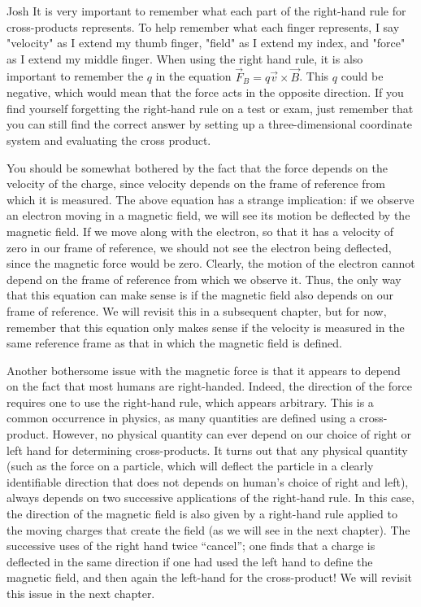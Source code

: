 \begin{studentOpinion}{Josh}{}
It is very important to remember what each part of the right-hand rule for cross-products represents. To help remember what each finger represents, I say "velocity" as I extend my thumb finger, "field" as I extend my index, and "force" as I extend my middle finger. When using the right hand rule, it is also important to remember the $q$ in the equation $\vec F_B = q\vec v \times \vec B$. This $q$ could be negative, which would mean that the force acts in the opposite direction.
If you find yourself forgetting the right-hand rule on a test or exam, just remember that you can still find the correct answer by setting up a three-dimensional coordinate system and evaluating the cross product.
\end{studentOpinion}
You should be somewhat bothered by the fact that the force depends on the velocity of the charge, since velocity depends on the frame of reference from which it is measured. The above equation has a strange implication: if we observe an electron moving in a magnetic field, we will see its motion be deflected by the magnetic field. If we move along with the electron, so that it has a velocity of zero in our frame of reference, we should not see the electron being deflected, since the magnetic force would be zero. Clearly, the motion of the electron cannot depend on the frame of reference from which we observe it. Thus, the only way that this equation can make sense is if the magnetic field also depends on our frame of reference. We will revisit this in a subsequent chapter, but for now, remember that this equation only makes sense if the velocity is measured in the same reference frame as that in which the magnetic field is defined.

Another bothersome issue with the magnetic force is that it appears to depend on the fact that most humans are right-handed. Indeed, the direction of the force requires one to use the right-hand rule, which appears arbitrary. This is a common occurrence in physics, as many quantities are defined using a cross-product. However, no physical quantity can ever depend on our choice of right or left hand for determining cross-products. It turns out that any physical quantity (such as the force on a particle, which will deflect the particle in a clearly identifiable direction that does not depends on human's choice of right and left), always depends on two successive applications of the right-hand rule. In this case, the direction of the magnetic field is also given by a right-hand rule applied to the moving charges that create the field (as we will see in the next chapter). The successive uses of the right hand twice ``cancel''; one finds that a charge is deflected in the same direction if one had used the left hand to define the magnetic field, and then again the left-hand for the cross-product! We will revisit this issue in the next chapter.

